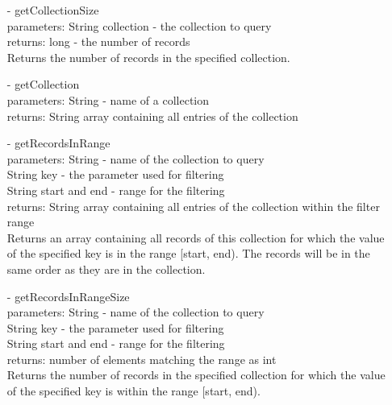 \documentclass[oneside, english, final]{design}
\begin{document}
\begin{itemize}
\begin{itemize}
		      \item[-]getCollectionSize
		            \\parameters: String collection - the collection to query
		            \\returns: long - the number of records
		            \\Returns the number of records in the specified collection.

		      \item[-]getCollection
		            \\parameters: String - name of a collection
		            \\returns: String array containing all entries of the collection

		      \item[-]getRecordsInRange
		            \\parameters: String - name of the collection to query
		            \\String key - the parameter used for filtering
		            \\String start and end - range for the filtering
		            \\returns: String array containing all entries of the collection within the filter range
		            \\ Returns an array containing all records of this
		            collection for which the value of the
		            specified key is in the range [start, end).
		            The records will be in the same order as
		            they are in the collection.

		      \item[-]getRecordsInRangeSize
		            \\parameters: String - name of the collection to query
		            \\String key - the parameter used for filtering
		            \\String start and end - range for the filtering
		            \\returns: number of elements matching the range as int
		            \\Returns the number of records in the specified
		            collection for which the value of the specified
		            key is within the range [start, end).

	      \end{itemize}

	      \newpage


\end{itemize}
\end{document}
